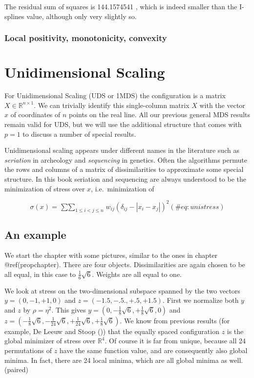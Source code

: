 \documentclass[
  12pt,
  letterpaper,
  DIV=11,
  numbers=noendperiod]{scrreprt}
\theoremstyle{remark}
\begin{document}
The residual sum of squares is 144.1574541 , which is indeed smaller
than the I-splines value, although only very slightly so.

\subsection{Local positivity, monotonicity,
convexity}\label{local-positivity-monotonicity-convexity}


\chapter{Unidimensional Scaling}\label{unidimensional}

For Unidimensional Scaling (UDS or 1MDS) the configuration is a matrix
\(X\in\mathbb{R}^{n\times 1}\). We can trivially identify this
single-column matrix \(X\) with the vector \(x\) of coordinates of \(n\)
points on the real line. All our previous general MDS results remain
valid for UDS, but we will use the additional structure that comes with
\(p=1\) to discuss a number of special results.

Unidimensional scaling appears under different names in the literature
such as \emph{seriation} in archeology and \emph{sequencing} in
genetics. Often the algorithms permute the rows and columns of a matrix
of dissimilarities to approximate some special structure. In this book
seriation and sequencing are always understood to be the minimization of
stress over \(x\), i.e.~minimization of

\begin{equation}
\sigma(x)=\mathop{\sum\sum}_{1\leq i<j\leq n}w_{ij}(\delta_{ij}-|x_i-x_j|)^2
(\#eq:unistress)
\end{equation}

\section{An example}\label{an-example-1}

We start the chapter with some pictures, similar to the ones in chapter
@ref(propchapter). There are four objects. Dissimilarities are again
chosen to be all equal, in this case to \(\frac16\sqrt{6}\). Weights are
all equal to one.

We look at stress on the two-dimensional subspace spanned by the two
vectors \(y=(0,-1,+1,0)\) and \(z=(-1.5,-.5.,+.5,+1.5)\). First we
normalize both \(y\) and \(z\) by \(\rho=\eta^2\). This gives
\(y=(0,-\frac18\sqrt{6},+\frac18\sqrt{6},0)\) and
\(z=(-\frac18\sqrt{6},-\frac{1}{24}\sqrt{6},+\frac{1}{24}\sqrt{6},+\frac18\sqrt{6})\).
We know from previous results (for example, De Leeuw and Stoop
()) that the equally spaced
configuration \(z\) is the global minimizer of stress over
\(\mathbb{R}^4\). Of course it is far from unique, because all 24
permutations of \(z\) have the same function value, and are consequently
also global minima. In fact, there are 24 local minima, which are all
global minima as well. (paired)
\end{document}
